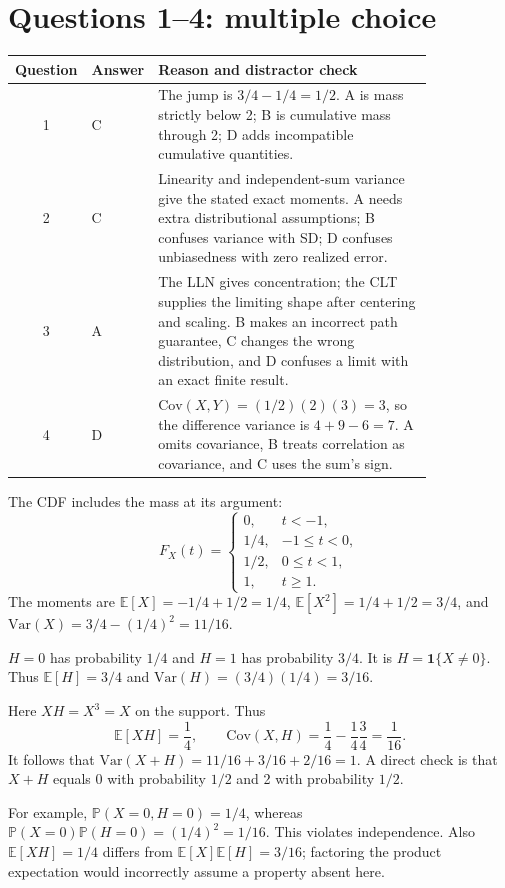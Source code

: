 \documentclass[11pt]{article}
\begin{document}
\section*{Questions 1--4: multiple choice}
\begin{tabular}{cp{0.08\linewidth}p{0.75\linewidth}}\toprule
Question & Answer & Reason and distractor check\\\midrule
1 & C & The jump is $3/4-1/4=1/2$. A is mass strictly below 2; B is cumulative mass through 2; D adds incompatible cumulative quantities.\\[5pt]
2 & C & Linearity and independent-sum variance give the stated exact moments. A needs extra distributional assumptions; B confuses variance with SD; D confuses unbiasedness with zero realized error.\\[5pt]
3 & A & The LLN gives concentration; the CLT supplies the limiting shape after centering and scaling. B makes an incorrect path guarantee, C changes the wrong distribution, and D confuses a limit with an exact finite result.\\[5pt]
4 & D & $\mathrm{Cov}(X,Y)=(1/2)(2)(3)=3$, so the difference variance is $4+9-6=7$. A omits covariance, B treats correlation as covariance, and C uses the sum's sign.\\\bottomrule
\end{tabular}

\begin{parts}
\item The CDF includes the mass at its argument:
\[
F_X(t)=\begin{cases}
0,&t<-1,\\
1/4,&-1\leq t<0,\\
1/2,&0\leq t<1,\\
1,&t\geq1.
\end{cases}
\]
The moments are $\mathbb E[X]=-1/4+1/2=1/4$, $\mathbb E[X^2]=1/4+1/2=3/4$, and $\mathrm{Var}(X)=3/4-(1/4)^2=11/16$.
\item $H=0$ has probability $1/4$ and $H=1$ has probability $3/4$. It is $H=\mathbf 1\{X\neq0\}$. Thus $\mathbb E[H]=3/4$ and $\mathrm{Var}(H)=(3/4)(1/4)=3/16$.
\item Here $XH=X^3=X$ on the support. Thus
\[
\mathbb E[XH]=\frac14,\qquad
\mathrm{Cov}(X,H)=\frac14-\frac14\frac34=\frac1{16}.
\]
It follows that $\mathrm{Var}(X+H)=11/16+3/16+2/16=1$. A direct check is that $X+H$ equals 0 with probability $1/2$ and 2 with probability $1/2$.
\item For example, $\mathbb P(X=0,H=0)=1/4$, whereas $\mathbb P(X=0)\mathbb P(H=0)=(1/4)^2=1/16$. This violates independence. Also $\mathbb E[XH]=1/4$ differs from $\mathbb E[X]\mathbb E[H]=3/16$; factoring the product expectation would incorrectly assume a property absent here.
\end{parts}
\end{document}
